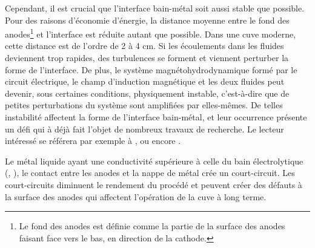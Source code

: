 Cependant, il est crucial que l'interface bain-métal soit aussi stable
que possible. Pour des raisons d'économie d'énergie, la distance
moyenne entre le fond des anodes\footnote{Le fond des anodes est
  définie comme la partie de la surface des anodes faisant face vers
  le bas, en direction de la cathode.} et l'interface est réduite
autant que possible. Dans une cuve moderne, cette distance est de
l'ordre de \num{2} à \num{4} \si{\centi\meter}. Si les écoulements
dans les fluides deviennent trop rapides, des turbulences se forment
et viennent perturber la forme de l'interface. De plus, le système
magnétohydrodynamique formé par le circuit électrique, le champ
d'induction magnétique et les deux fluides peut devenir, sous
certaines conditions, physiquement instable, c'est-à-dire que de
petites perturbations du système sont amplifiées par elles-mêmes. De
telles instabilité affectent la forme de l'interface bain-métal, et
leur occurrence présente un défi qui à déjà fait l'objet de nombreux
travaux de recherche. Le lecteur intéressé se référera par exemple à
\cite{Descloux1998}, \cite{Sneyd1985} ou encore \cite{Maillard1996}.

Le métal liquide ayant une conductivité supérieure à celle du bain
électrolytique (\cite{Wang1992}, \cite{Apfelbaum2003}), le contact
entre les anodes et la nappe de métal crée un court-circuit. Les
court-circuits diminuent le rendement du procédé et peuvent créer des
défauts à la surface des anodes qui affectent l'opération de la cuve à
long terme.



